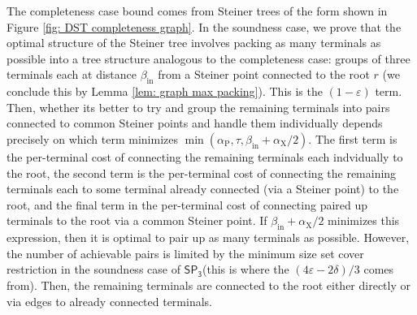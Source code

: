 \documentclass{article}\providecommand{\DeclareRedundantLanguages}[2]{}\usepackage[a4paper,margin=20mm]{geometry}
\newcommand{\1}{\textbf{1}}
\newcommand{\setpT}{$\mathsf{SP_3}$\xspace}
\newcommand{\td}{\tau}
\newcommand{\srd}{\alpha_{\text{X}}}
\newcommand{\trd}{\alpha_{\text{P}}}
\begin{document}
\begin{remark}
The completeness case bound comes from Steiner trees of the form shown in Figure \ref{fig: DST completeness graph}. In the soundness case, we prove that the optimal structure of the Steiner tree involves packing as many terminals as possible into a tree structure analogous to the completeness case: groups of three terminals each at distance $\beta_{\text{in}}$ from a Steiner point connected to the root $r$ (we conclude this by Lemma \ref{lem: graph max packing}). This is the $(1-\varepsilon)$ term. Then, whether its better to try and group the remaining terminals into pairs connected to common Steiner points and handle them individually depends precisely on which term minimizes $\min(\trd, \td, \beta_{\text{in}} + \srd/2)$. The first term is the per-terminal cost of connecting the remaining terminals each indvidually to the root, the second term is the per-terminal cost of connecting the remaining terminals each to some terminal already connected (via a Steiner point) to the root, and the final term in the per-terminal cost of connecting paired up terminals to the root via a common Steiner point. If $\beta_{\text{in}} + \srd/2$ minimizes this expression, then it is optimal to pair up as many terminals as possible. However, the number of achievable pairs is limited by the minimum size set cover restriction in the soundness case of \setpT (this is where the $(4\varepsilon - 2\delta)/3$ comes from). Then, the remaining terminals are connected to the root either directly or via edges to already connected terminals.
\end{remark}
\end{document}
